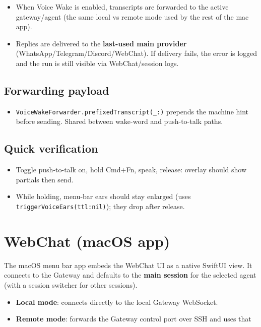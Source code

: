 \begin{itemize}
  \item When Voice Wake is enabled, transcripts are forwarded to the active gateway/agent (the same local vs remote mode used by the rest of the mac app).
  \item Replies are delivered to the \textbf{last-used main provider} (WhatsApp/Telegram/Discord/WebChat). If delivery fails, the error is logged and the run is still visible via WebChat/session logs.
\end{itemize}


\subsection{Forwarding payload}


\begin{itemize}
  \item \texttt{VoiceWakeForwarder.prefixedTranscript(\_:)} prepends the machine hint before sending. Shared between wake-word and push-to-talk paths.
\end{itemize}


\subsection{Quick verification}


\begin{itemize}
  \item Toggle push-to-talk on, hold Cmd+Fn, speak, release: overlay should show partials then send.
  \item While holding, menu-bar ears should stay enlarged (uses \texttt{triggerVoiceEars(ttl:nil)}); they drop after release.
\end{itemize}



\clearpage

\section{WebChat (macOS app)}


The macOS menu bar app embeds the WebChat UI as a native SwiftUI view. It
connects to the Gateway and defaults to the \textbf{main session} for the selected
agent (with a session switcher for other sessions).

\begin{itemize}
  \item \textbf{Local mode}: connects directly to the local Gateway WebSocket.
  \item \textbf{Remote mode}: forwards the Gateway control port over SSH and uses that
\end{itemize}

